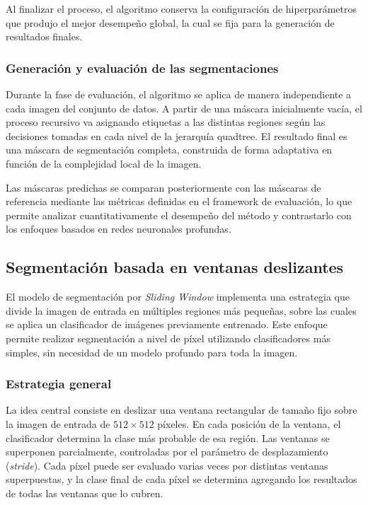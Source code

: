 \documentclass[onecolumn, 12pt , journal]{IEEEtran}
\begin{document}
Al finalizar el proceso, el algoritmo conserva la configuración de hiperparámetros que produjo el mejor desempeño global, la cual se fija para la generación de resultados finales.

\subsubsection{Generación y evaluación de las segmentaciones}

Durante la fase de evaluación, el algoritmo se aplica de manera independiente a cada imagen del conjunto de datos. A partir de una máscara inicialmente vacía, el proceso recursivo va asignando etiquetas a las distintas regiones según las decisiones tomadas en cada nivel de la jerarquía quadtree. El resultado final es una máscara de segmentación completa, construida de forma adaptativa en función de la complejidad local de la imagen.

Las máscaras predichas se comparan posteriormente con las máscaras de referencia mediante las métricas definidas en el framework de evaluación, lo que permite analizar cuantitativamente el desempeño del método y contrastarlo con los enfoques basados en redes neuronales profundas.

\subsection{Segmentación basada en ventanas deslizantes}

El modelo de segmentación por \textit{Sliding Window} implementa una estrategia que divide la imagen de entrada en múltiples regiones más pequeñas, sobre las cuales se aplica un clasificador de imágenes previamente entrenado. Este enfoque permite realizar segmentación a nivel de píxel utilizando clasificadores más simples, sin necesidad de un modelo profundo para toda la imagen.

\subsubsection{Estrategia general}

La idea central consiste en deslizar una ventana rectangular de tamaño fijo sobre la imagen de entrada de $512 \times 512$ píxeles. En cada posición de la ventana, el clasificador determina la clase más probable de esa región. Las ventanas se superponen parcialmente, controladas por el parámetro de desplazamiento (\textit{stride}). Cada píxel puede ser evaluado varias veces por distintas ventanas superpuestas, y la clase final de cada píxel se determina agregando los resultados de todas las ventanas que lo cubren.
\end{document}
